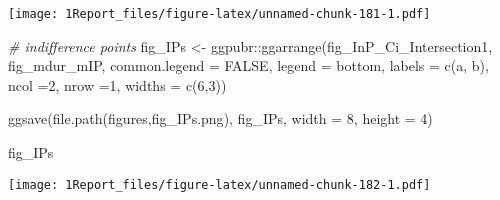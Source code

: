 \documentclass[
]{article}
\newenvironment{Shaded}{\begin{snugshade}}{\end{snugshade}}
\newcommand{\AttributeTok}[1]{\textcolor[rgb]{0.77,0.63,0.00}{#1}}
\newcommand{\CommentTok}[1]{\textcolor[rgb]{0.56,0.35,0.01}{\textit{#1}}}
\newcommand{\ConstantTok}[1]{\textcolor[rgb]{0.00,0.00,0.00}{#1}}
\newcommand{\DecValTok}[1]{\textcolor[rgb]{0.00,0.00,0.81}{#1}}
\newcommand{\FunctionTok}[1]{\textcolor[rgb]{0.00,0.00,0.00}{#1}}
\newcommand{\NormalTok}[1]{#1}
\newcommand{\OtherTok}[1]{\textcolor[rgb]{0.56,0.35,0.01}{#1}}
\newcommand{\SpecialCharTok}[1]{\textcolor[rgb]{0.00,0.00,0.00}{#1}}
\newcommand{\StringTok}[1]{\textcolor[rgb]{0.31,0.60,0.02}{#1}}
\begin{document}
\texttt{[image: 1Report\_files/figure-latex/unnamed-chunk-181-1.pdf]}

\begin{Shaded}
\begin{Highlighting}[]
\CommentTok{\# indifference points}
\NormalTok{fig\_IPs }\OtherTok{\textless{}{-}}\NormalTok{ ggpubr}\SpecialCharTok{::}\FunctionTok{ggarrange}\NormalTok{(fig\_InP\_Ci\_Intersection1, fig\_mdur\_mIP, }\AttributeTok{common.legend =} \ConstantTok{FALSE}\NormalTok{, }\AttributeTok{legend =} \StringTok{\textquotesingle{}bottom\textquotesingle{}}\NormalTok{, }\AttributeTok{labels =} \FunctionTok{c}\NormalTok{(}\StringTok{\textquotesingle{}a\textquotesingle{}}\NormalTok{, }\StringTok{\textquotesingle{}b\textquotesingle{}}\NormalTok{), }\AttributeTok{ncol =}\DecValTok{2}\NormalTok{, }\AttributeTok{nrow =}\DecValTok{1}\NormalTok{, }\AttributeTok{widths =} \FunctionTok{c}\NormalTok{(}\DecValTok{6}\NormalTok{,}\DecValTok{3}\NormalTok{))}

\FunctionTok{ggsave}\NormalTok{(}\FunctionTok{file.path}\NormalTok{(}\StringTok{\textquotesingle{}figures\textquotesingle{}}\NormalTok{,}\StringTok{\textquotesingle{}fig\_IPs.png\textquotesingle{}}\NormalTok{), fig\_IPs, }\AttributeTok{width =} \DecValTok{8}\NormalTok{, }\AttributeTok{height =} \DecValTok{4}\NormalTok{)}

\NormalTok{fig\_IPs}
\end{Highlighting}
\end{Shaded}

\texttt{[image: 1Report\_files/figure-latex/unnamed-chunk-182-1.pdf]}
\end{document}
